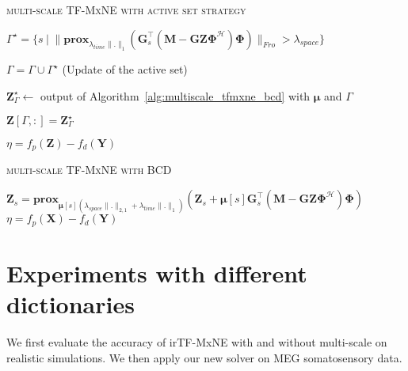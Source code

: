 {\fontsize{4}{4}\selectfont
\begin{algorithm}[t]
\caption{\textsc{multi-scale TF-MxNE with active set strategy}}
\While{
		$\eta \geq \epsilon$
	  }
	  {
	  	$\Gamma^\star = \{s \hspace{3pt} | \hspace{3pt} \|\textbf{prox}_{\lambda_{time}\|.\|_1}(\mathbf{G}_s^\top(\mathbf{M}-\mathbf{GZ\Phi}^\mathcal{H})\mathbf{\Phi})\|_{Fro} > \lambda_{space} \}$
	  	
	  	$\Gamma = \Gamma \cup \Gamma^\star$ \quad (Update of the active set)
	  	
	  	$\mathbf{Z}^{\star}_\Gamma \leftarrow$ output of Algorithm~\ref{alg:multiscale_tfmxne_bcd} with $\mathbf{\mu}$ and $\Gamma$
	  	
	  	$\mathbf{Z}[\Gamma, :] = \mathbf{Z}^{\star}_\Gamma$ %

	  	$\eta=f_p(\mathbf{Z})-f_d(\mathbf{Y})$
	  }
\label{alg:multiscale_tfmxne_activeset}
\end{algorithm}
}

{\fontsize{4}{4}\selectfont
\begin{algorithm}[t]
\caption{\textsc{multi-scale TF-MxNE with BCD}}
\While{
		$\eta \geq \epsilon$
	  }
	  {
	  		{
	  			$\mathbf{Z}_s = \textbf{prox}_{\mathbf{\mu}[s](\lambda_{space}\|.\|_{2,1}+\lambda_{time}\|.\|_1)}(\mathbf{Z}_s+\mathbf{\mu}[s]\mathbf{G}^\top_s(\mathbf{M}-\mathbf{GZ\Phi}^\mathcal{H})\mathbf{\Phi})$
	  		}
	  	$\eta = f_p(\mathbf{X})-f_d(\mathbf{Y})$
	  }
\label{alg:multiscale_tfmxne_bcd}
\end{algorithm}
}


\section{Experiments with different dictionaries}
We first evaluate the accuracy of irTF-MxNE with and without multi-scale on realistic simulations. We then apply our new solver on MEG somatosensory data.

